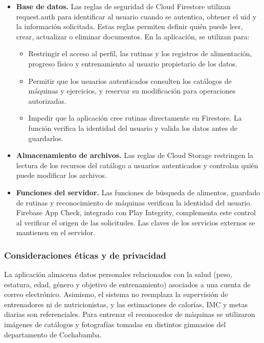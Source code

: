 \begin{itemize}
    \item \textbf{Base de datos.} Las reglas de seguridad de Cloud Firestore
    utilizan request.auth para identificar al usuario cuando se
    autentica, obtener el uid y la información solicitada.
    Estas reglas permiten definir quién puede leer, crear, actualizar o
    eliminar documentos. En la aplicación, se utilizan para:
    \begin{itemize}
        \item Restringir el acceso al perfil, las rutinas y los registros
        de alimentación, progreso físico y entrenamiento al usuario
        propietario de los datos.
        \item Permitir que los usuarios autenticados consulten los catálogos
        de máquinas y ejercicios, y reservar su modificación para
        operaciones autorizadas.
        \item Impedir que la aplicación cree rutinas directamente en
        Firestore. La función  verifica la identidad
        del usuario y valida los datos antes de guardarlos.
    \end{itemize}

    \item \textbf{Almacenamiento de archivos.} Las reglas de Cloud Storage
    restringen la lectura de los recursos del catálogo a usuarios
    autenticados y controlan quién puede modificar los archivos.

    \item \textbf{Funciones del servidor.} Las funciones de búsqueda de
    alimentos, guardado de rutinas y reconocimiento de máquinas verifican
    la identidad del usuario. Firebase App Check, integrado con Play
    Integrity, complementa este control al verificar el origen de las
    solicitudes. Las claves de los servicios externos se mantienen en
    el servidor.
\end{itemize}

\subsubsection{Consideraciones éticas y de privacidad}
\label{sec:etica}

La aplicación almacena datos personales relacionados con la salud (peso,
estatura, edad, género y objetivo de entrenamiento) asociados a una cuenta de
correo electrónico. Asimismo, el sistema no reemplaza la supervisión de entrenadores ni de
nutricionistas, y las estimaciones de calorías, IMC y metas diarias son
referenciales. Para entrenar el reconocedor de máquinas se utilizaron imágenes
de catálogos y fotografías tomadas en distintos gimnasios del departamento
de Cochabamba.

